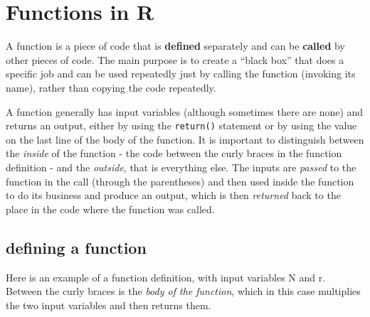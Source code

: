\documentclass[
  letterpaper,
  DIV=11,
  numbers=noendperiod]{scrreprt}
\begin{document}
\hypertarget{functions-in-r-1}{%
\section*{Functions in R}\label{functions-in-r-1}}


\begin{tcolorbox}[enhanced jigsaw, arc=.35mm, colframe=quarto-callout-tip-color-frame, left=2mm, opacitybacktitle=0.6, breakable, title=\textcolor{quarto-callout-tip-color}{\faLightbulb}\hspace{0.5em}{Function}, toprule=.15mm, coltitle=black, bottomtitle=1mm, toptitle=1mm, colback=white, leftrule=.75mm, colbacktitle=quarto-callout-tip-color!10!white, titlerule=0mm, opacityback=0, rightrule=.15mm, bottomrule=.15mm]

A function is a piece of code that is \textbf{defined} separately and
can be \textbf{called} by other pieces of code. The main purpose is to
create a ``black box'' that does a specific job and can be used
repeatedly just by calling the function (invoking its name), rather than
copying the code repeatedly.

\end{tcolorbox}

A function generally has input variables (although sometimes there are
none) and returns an output, either by using the \texttt{return()}
statement or by using the value on the last line of the body of the
function. It is important to distinguish between the \emph{inside} of
the function - the code between the curly braces in the function
definition - and the \emph{outside}, that is everything else. The inputs
are \emph{passed} to the function in the call (through the parentheses)
and then used inside the function to do its business and produce an
output, which is then \emph{returned} back to the place in the code
where the function was called.

\hypertarget{defining-a-function-1}{%
\subsection*{defining a function}\label{defining-a-function-1}}

Here is an example of a function definition, with input variables N and
r. Between the curly braces is the \emph{body of the function}, which in
this case multiplies the two input variables and then returns them.
\end{document}
